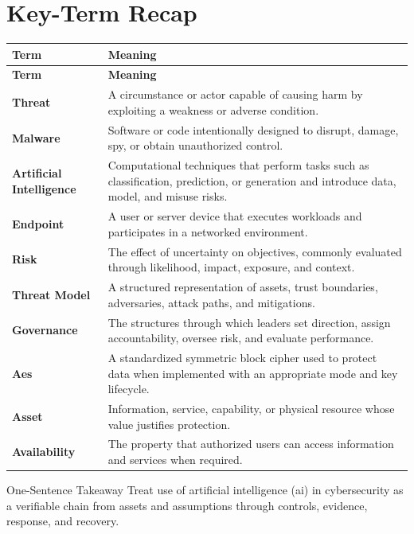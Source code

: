 \documentclass[11pt,letterpaper]{article}
\begin{document}
\section*{Key-Term Recap}
\begin{longtable}{>{\raggedright\arraybackslash}p{}>{\raggedright\arraybackslash}p{}}
\toprule\rowcolor{Navy}\color{white}\textbf{Term} & \color{white}\textbf{Meaning}\\\midrule
\endfirsthead
\toprule\rowcolor{Navy}\color{white}\textbf{Term} & \color{white}\textbf{Meaning}\\\midrule
\endhead
\textbf{Threat} & A circumstance or actor capable of causing harm by exploiting a weakness or adverse condition. \\\midrule
\textbf{Malware} & Software or code intentionally designed to disrupt, damage, spy, or obtain unauthorized control. \\\midrule
\textbf{Artificial Intelligence} & Computational techniques that perform tasks such as classification, prediction, or generation and introduce data, model, and misuse risks. \\\midrule
\textbf{Endpoint} & A user or server device that executes workloads and participates in a networked environment. \\\midrule
\textbf{Risk} & The effect of uncertainty on objectives, commonly evaluated through likelihood, impact, exposure, and context. \\\midrule
\textbf{Threat Model} & A structured representation of assets, trust boundaries, adversaries, attack paths, and mitigations. \\\midrule
\textbf{Governance} & The structures through which leaders set direction, assign accountability, oversee risk, and evaluate performance. \\\midrule
\textbf{Aes} & A standardized symmetric block cipher used to protect data when implemented with an appropriate mode and key lifecycle. \\\midrule
\textbf{Asset} & Information, service, capability, or physical resource whose value justifies protection. \\\midrule
\textbf{Availability} & The property that authorized users can access information and services when required. \\\midrule
\bottomrule
\end{longtable}
\begin{CornellExamBox}{One-Sentence Takeaway}
Treat use of artificial intelligence (ai) in cybersecurity as a verifiable chain from assets and assumptions through controls, evidence, response, and recovery.
\end{CornellExamBox}
\end{document}

